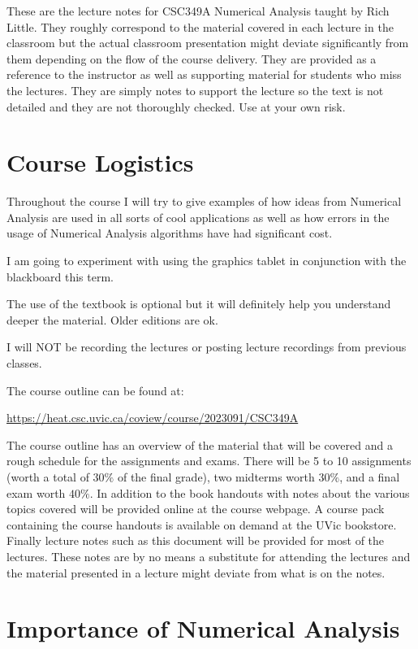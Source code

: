 \documentclass [titlepage,12pt,letter] {article}
\begin{document}
 


These are the lecture notes for CSC349A Numerical Analysis taught by
Rich Little. They roughly correspond to
the material covered in each lecture in the classroom but the actual
classroom presentation might deviate significantly from them depending
on the flow of the course delivery. They are provided as a reference to
the instructor as well as supporting material for students who miss
the lectures. They are simply notes to support the lecture so the text
is not detailed and they are not thoroughly checked. Use at your own
risk.

\section{Course Logistics} 

Throughout the course I will try to give examples of how
ideas from Numerical Analysis are used in all sorts of cool
applications as well as how errors in the usage of Numerical Analysis
algorithms have had significant cost. 

I am going to experiment with using the graphics tablet in conjunction with the blackboard this term.

The use of the textbook is optional but it will
definitely help you understand deeper the material. Older editions are ok. 

I will NOT be recording the lectures or posting lecture recordings from previous classes.

The course outline can be found at:

\url{https://heat.csc.uvic.ca/coview/course/2023091/CSC349A} 

The course outline has an overview of the material that will be
covered and a rough schedule for the assignments and exams. 
There will be 5 to 10 assignments (worth a total of $30\%$ of the final
grade), two midterms worth $30\%$, and a final exam worth $40\%$. In
addition to the book handouts with notes about the various topics
covered will be provided online at the course webpage. A course pack
containing the course handouts is available on demand at the UVic
bookstore. Finally lecture notes such as this document will be
provided for most of the lectures. These notes are by no means a
substitute for attending the lectures and the material presented in a
lecture might deviate from what is on the notes.





\section{Importance of Numerical Analysis} 
\end{document}
